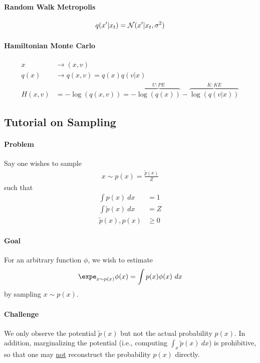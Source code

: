\documentclass{article}
\begin{document}
	\paragraph{Random Walk Metropolis}
	\begin{align}
		q(x'|x_t) = \mathcal{{N}} (x'|x_t, \sigma^2)
	\end{align}

	\paragraph{Hamiltonian Monte Carlo}
	\begin{align}
		x &\to (x, v) \\
		q(x) &\to q(x, v) = q(x) q(v|x) \\
		H(x, v) &= - \log(q(x, v)) = - \overbrace{\log(q(x))}^{U: PE} - \overbrace{\log(q(v|x))}^{K: KE}
	\end{align}
	
	\subsection{Tutorial on Sampling}
	\paragraph{Problem} Say one wishes to sample 
	\begin{align}
		x \sim p(x) = \frac{\tilde{p}(x)}{Z}
	\end{align}
	such that
	\begin{align}
		\int p(x)\ dx &= 1 \\
		\int \tilde{p}(x)\ dx &= Z \\
		\tilde{p}(x), p(x) &\geq 0
	\end{align}

	\paragraph{Goal} For an arbitrary function $\phi$, we wish to estimate
	\begin{align}
		\expe_{x \sim p(x)} \phi(x) = \int p(x) \phi(x)\ dx
	\end{align}
	by sampling $x \sim p(x)$.

	\paragraph{Challenge} We only observe the potential $\tilde{p}(x)$ but not the actual probability $p(x)$. In addition, marginalizing the potential (i.e., computing $\int_x \tilde{p}(x)\ dx$) is prohibitive, so that one may \ul{not} reconstruct the probability $p(x)$ directly.
\end{document}
